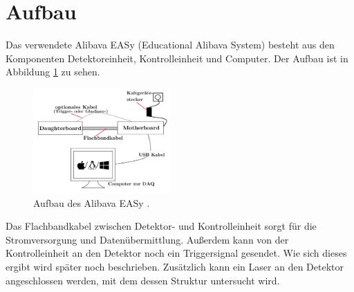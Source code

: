 \section{Aufbau}

Das verwendete Alibava EASy (Educational Alibava System) besteht aus den Komponenten Detektoreinheit, Kontrolleinheit und Computer.
Der Aufbau ist in Abbildung \ref{fig:aufbau} zu sehen.
\begin{figure}
  \centering
  \includegraphics[height=4cm]{TimosAufrisse/aufbau.png}
  \caption{Aufbau des Alibava EASy \cite{anleitung}.}
  \label{fig:aufbau}
\end{figure}
Das Flachbandkabel zwischen Detektor- und Kontrolleinheit sorgt für die Stromversorgung und Datenübermittlung. Außerdem kann von der Kontrolleinheit an den Detektor noch ein Triggersignal gesendet. Wie sich dieses ergibt wird später noch beschrieben. Zusätzlich kann ein Laser an den Detektor angeschlossen werden, mit dem dessen Struktur untersucht wird.

